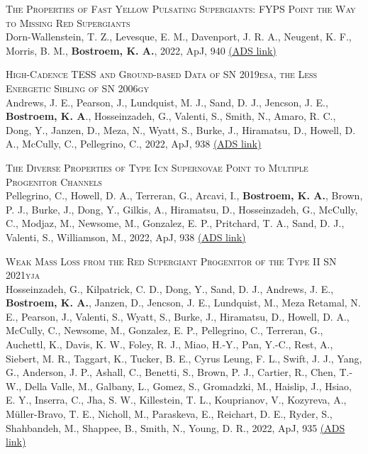 \begin{revnumerate}[67]
    \item{\textsc{The Properties of Fast Yellow Pulsating Supergiants: FYPS Point the Way to Missing Red Supergiants}\\ 
Dorn-Wallenstein, T. Z., Levesque, E. M., Davenport, J. R. A., Neugent, K. F., Morris, B. M., \textbf{Bostroem, K. A.}, 2022, ApJ, 940 
\color{blue}\href{https://ui.adsabs.harvard.edu/abs/2022ApJ...940...27D}{(ADS link)}\color{black}}\\

    \item{\textsc{High-Cadence TESS and Ground-based Data of SN 2019esa, the Less Energetic Sibling of SN 2006gy}\\ 
    Andrews, J. E., Pearson, J., Lundquist, M. J., Sand, D. J., Jencson, J. E., \textbf{Bostroem, K. A}., Hosseinzadeh, G., Valenti, S., Smith, N., Amaro, R. C., Dong, Y., Janzen, D., Meza, N., Wyatt, S., Burke, J., Hiramatsu, D., Howell, D. A., McCully, C., Pellegrino, C., 2022, ApJ, 938 
    \color{blue}\href{https://ui.adsabs.harvard.edu/abs/2022ApJ...938...19A}{(ADS link)}\color{black}}\\
    
    \item{\textsc{The Diverse Properties of Type Icn Supernovae Point to Multiple Progenitor Channels}\\ 
    Pellegrino, C., Howell, D. A., Terreran, G., Arcavi, I., \textbf{Bostroem, K. A.}, Brown, P. J., Burke, J., Dong, Y., Gilkis, A., Hiramatsu, D., Hosseinzadeh, G., McCully, C., Modjaz, M., Newsome, M., Gonzalez, E. P., Pritchard, T. A., Sand, D. J., Valenti, S., Williamson, M., 2022, ApJ, 938 
    \color{blue}\href{https://ui.adsabs.harvard.edu/abs/2022ApJ...938...73P}{(ADS link)}\color{black}}\\
    
    \item{\textsc{Weak Mass Loss from the Red Supergiant Progenitor of the Type II SN 2021yja}\\ 
    Hosseinzadeh, G., Kilpatrick, C. D., Dong, Y., Sand, D. J., Andrews, J. E., \textbf{Bostroem, K. A.}, Janzen, D., Jencson, J. E., Lundquist, M., Meza Retamal, N. E., Pearson, J., Valenti, S., Wyatt, S., Burke, J., Hiramatsu, D., Howell, D. A., McCully, C., Newsome, M., Gonzalez, E. P., Pellegrino, C., Terreran, G., Auchettl, K., Davis, K. W., Foley, R. J., Miao, H.-Y., Pan, Y.-C., Rest, A., Siebert, M. R., Taggart, K., Tucker, B. E., Cyrus Leung, F. L., Swift, J. J., Yang, G., Anderson, J. P., Ashall, C., Benetti, S., Brown, P. J., Cartier, R., Chen, T.-W., Della Valle, M., Galbany, L., Gomez, S., Gromadzki, M., Haislip, J., Hsiao, E. Y., Inserra, C., Jha, S. W., Killestein, T. L., Kouprianov, V., Kozyreva, A., Müller-Bravo, T. E., Nicholl, M., Paraskeva, E., Reichart, D. E., Ryder, S., Shahbandeh, M., Shappee, B., Smith, N., Young, D. R., 2022, ApJ, 935 
    \color{blue}\href{https://ui.adsabs.harvard.edu/abs/2022ApJ...935...31H}{(ADS link)}\color{black}}\\
    

\end{revnumerate}
